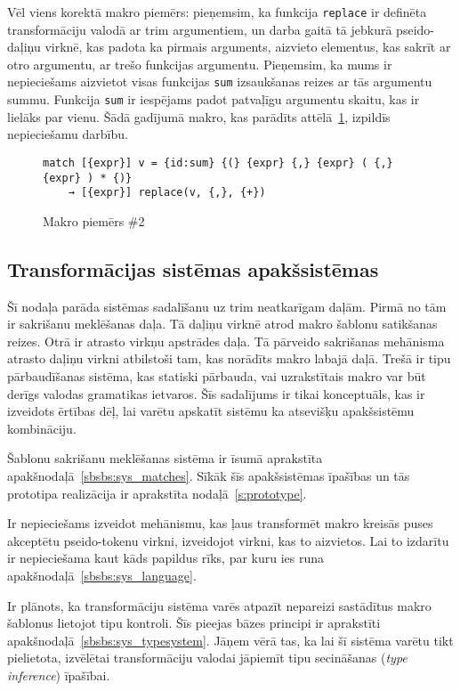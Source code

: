 Vēl viens korektā makro piemērs: pieņemsim, ka funkcija \verb|replace| ir definēta transformāciju valodā ar trim argumentiem, un darba gaitā tā jebkurā pseido-daļiņu virknē, kas padota ka pirmais arguments, aizvieto elementus, kas sakrīt ar otro argumentu, ar trešo funkcijas argumentu. Pieņemsim, ka mums ir nepieciešams aizvietot visas funkcijas \verb|sum| izsaukšanas reizes ar tās argumentu summu. Funkcija \verb|sum| ir iespējams padot patvaļīgu argumentu skaitu, kas ir lielāks par vienu. Šādā gadījumā makro, kas parādīts attēlā~\ref{fig:matchsample2}, izpildīs nepieciešamu darbību.

\begin{figure}[h!]
\begin{verbatim}
match [{expr}] v = {id:sum} {(} {expr} {,} {expr} ( {,} {expr} ) * {)}
    → [{expr}] replace(v, {,}, {+})
\end{verbatim}
\caption{\label{fig:matchsample2}Makro piemērs \#2}
\end{figure}

\subsection{\label{sbs:sys_qualities}Transformācijas sistēmas apakšsistēmas}

Šī nodaļa parāda sistēmas sadalīšanu uz trim neatkarīgam daļām. Pirmā no tām ir sakrišanu meklēšanas daļa. Tā daļiņu virknē atrod makro šablonu satikšanas reizes. Otrā ir atrasto virkņu apstrādes daļa. Tā pārveido sakrišanas mehānisma atrasto daļiņu virkni atbilstoši tam, kas norādīts makro labajā daļā. Trešā ir tipu pārbaudīšanas sistēma, kas statiski pārbauda, vai uzrakstītais makro var būt derīgs valodas gramatikas ietvaros. Šīs sadalījums ir tikai konceptuāls, kas ir izveidots ērtības dēļ, lai varētu apskatīt sistēmu ka atsevišķu apakšsistēmu kombināciju.

Šablonu sakrišanu meklēšanas sistēma ir īsumā aprakstīta apakšnodaļā~\ref{sbsbs:sys_matches}. Sīkāk šīs apakšsistēmas īpašības un tās prototipa realizācija ir aprakstīta nodaļā~\ref{s:prototype}.

Ir nepieciešams izveidot mehānismu, kas ļaus transformēt makro kreisās puses akceptētu pseido-tokenu virkni, izveidojot virkni, kas to aizvietos. Lai to izdarītu ir nepieciešama kaut kāds papildus rīks, par kuru ies runa apakšnodaļā~\ref{sbsbs:sys_language}.

Ir plānots, ka transformāciju sistēma varēs atpazīt nepareizi sastādītus makro šablonus lietojot tipu kontroli. Šīs pieejas bāzes principi ir aprakstīti apakšnodaļā~\ref{sbsbs:sys_typesystem}. Jāņem vērā tas, ka lai šī sistēma varētu tikt pielietota, izvēlētai transformāciju valodai jāpiemīt tipu secināšanas (\emph{type inference}) īpašībai.

